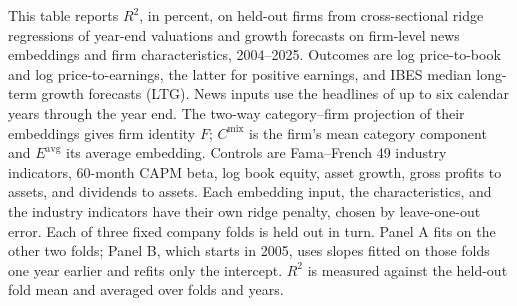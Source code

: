 \begin{table}[htbp]
\centering
\caption{Valuations and Growth Forecasts Explained by Firm Embeddings}
\label{tab:tab4}
\begin{minipage}{\linewidth}\footnotesize
This table reports $R^2$, in percent, on held-out firms from cross-sectional ridge regressions of year-end valuations and growth forecasts on firm-level news embeddings and firm characteristics, 2004--2025. Outcomes are log price-to-book and log price-to-earnings, the latter for positive earnings, and IBES median long-term growth forecasts (LTG). News inputs use the headlines of up to six calendar years through the year end. The two-way category--firm projection of their embeddings gives firm identity $F$; $C^{\mathrm{mix}}$ is the firm's mean category component and $E^{\mathrm{avg}}$ its average embedding. Controls are Fama--French 49 industry indicators, 60-month CAPM beta, log book equity, asset growth, gross profits to assets, and dividends to assets. Each embedding input, the characteristics, and the industry indicators have their own ridge penalty, chosen by leave-one-out error. Each of three fixed company folds is held out in turn. Panel A fits on the other two folds; Panel B, which starts in 2005, uses slopes fitted on those folds one year earlier and refits only the intercept. $R^2$ is measured against the held-out fold mean and averaged over folds and years.
\end{minipage}
\medskip


\end{table}
